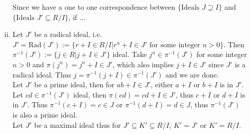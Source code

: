\documentclass[a4paper,10pt]{article}
\theoremstyle{definition}
\begin{document}
\begin{enumerate}[1.]
\begin{enumerate}[(i)]
Since we have a one to one correspondence between $\{\text{Ideals }J \supseteq I\}$ and $\{\text{Ideals }J' \subseteq R/I\}$, if ...

\item Let $J'$ be a radical ideal, i.e. $J' = \text{Rad}(J'):=\{r +I\in R/I | r^n+I \in J' \text{ for some integer } n > 0\}$. Then $\pi^{-1}(J'):=\{j \in R | j+I \in J'\}$ ideal. Take $j^n \in \pi^{-1}(J')$ for some integer $n>0$ and $\pi(j^n) = j^n+ I \in J'$, which also implies $j +I \in J'$ since $J'$ is a radical ideal. Thus $j = \pi^{-1}(j+I) \in \pi^{-1}(J')$ and we are done.
\\
Let $J'$ be a prime ideal, then for $ab+I\in J'$, either $a+I$ or $b+I$ is in $J'$. Let $cd \in \pi^{-1}(J')$ ideal, then $\pi(cd) = cd +I \in J'$, thus $c +I$ or $d+I$ is in $J'$. Thus $\pi^{-1}(c +I) = c \in J$ or $\pi^{-1}(d +I) = d \in J$, thus $\pi^{-1}(J')$ is also a prime ideal.
\\Let $J'$ be a maximal ideal thus for $J' \subseteq K' \subseteq R/I$, $K'=J'$ or $K'=R/I$.
\end{enumerate}


\end{enumerate}
\end{document}
